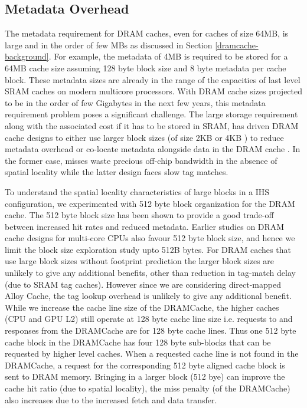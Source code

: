 \subsection{Metadata Overhead}
The metadata requirement for DRAM caches, even for caches of size 64MB, is large and in the order of few MBs as discussed in Section \ref{dramcache-background}. For example, the metadata of 4MB is required to be stored for a 64MB cache size assuming 128 byte block size and 8 byte metadata per cache block. These metadata sizes are  already in the range of the capacities of last level SRAM caches on modern multicore processors. With DRAM cache sizes projected to be in the order of few Gigabytes in the next few years, this metadata requirement problem poses a significant challenge. The large storage requirement along with the associated cost if it has to be stored in SRAM, has driven DRAM cache designs to either use larger block sizes (of size 2KB or 4KB \cite{footprint,unison-cache}) to reduce metadata overhead or co-locate metadata alongside data in the DRAM cache \cite{loh-hill,alloy,atcache}. 
In the former case, misses waste precious off-chip bandwidth in the absence of spatial locality while the latter design faces slow tag matches.
\par To understand the spatial locality characteristics of large blocks in a IHS configuration, we experimented with 512 byte block organization for the DRAM cache. The 512 byte block size has been shown to provide a good trade-off between increased hit rates and reduced metadata. Earlier studies on DRAM cache designs for multi-core CPUs \cite{bimodal} also favour 512 byte block size, and hence we limit the block size exploration study upto 512B bytes. For DRAM caches that use large block sizes without footprint prediction the larger block sizes are unlikely to give any additional benefits, other than reduction in tag-match delay (due to SRAM tag caches).  However since we are considering direct-mapped Alloy Cache, the tag lookup overhead is unlikely to give any additional benefit. While we increase the cache line size of the DRAMCache, the higher caches (CPU and GPU L2) still operate at 128 byte cache line size i.e. requests to and responses from the DRAMCache are for 128 byte cache lines. Thus one 512 byte cache block in the DRAMCache has four 128 byte sub-blocks that can be requested by higher level caches. When a requested cache line is not found in the DRAMCache, a request for the corresponding 512 byte aligned cache block is sent to DRAM memory. Bringing in a larger block (512 bye) can improve the cache hit ratio (due to spatial locality), the miss penalty (of the DRAMCache) also increases due to the increased fetch and data transfer.
